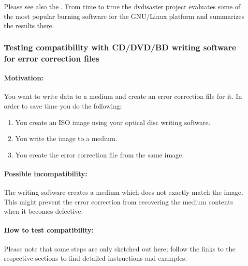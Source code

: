 \smallskip

Please see also the . From time 
to time the dvdisaster project evaluates some of the most popular burning 
software for the GNU/Linux platform and summarizes the results there. 


\subsubsection{Testing compatibility with CD/DVD/BD writing software for error correction files}
\label{howto-compat-file}

\paragraph{Motivation:} You want to write data to a medium and create an error correction file for it.
In order to save time you do the following:

\begin{enumerate}
\item You create an ISO image using your optical disc writing software.
\item You write the image to a medium.
\item You create the error correction file from the same image.
\end{enumerate}

\paragraph{Possible incompatibility:} The writing software creates a medium which
does not exactly match the image. This might prevent the error correction from recovering
the medium contents when it becomes defective. 

\paragraph{How to test compatibility:} Please note that some steps are only sketched out here; follow
the links to the respective sections to find detailed instructions and examples.

\bigskip

